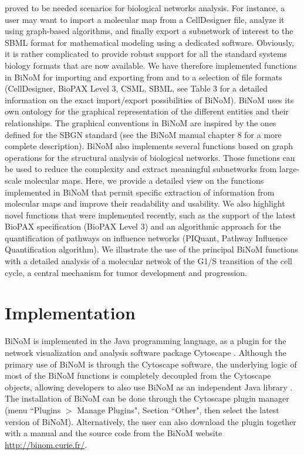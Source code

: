 \documentclass[10pt]{bmc_article}
\newenvironment{bmcformat}{\baselineskip20pt\sloppy\setboolean{publ}{false}}{\baselineskip20pt\sloppy}
\begin{document}
\begin{bmcformat}
proved to be needed scenarios for biological networks analysis. For instance, a user may want
to import a molecular map from a CellDesigner file, analyze it using graph-based
algorithms, and finally export a subnetwork of interest to the SBML format for
mathematical modeling using a dedicated software. Obviously, it is rather
complicated to provide robust support for all the standard systems biology
formats that are now available. We have therefore implemented functions in BiNoM
for importing and exporting from and to a selection of file formats
(CellDesigner, BioPAX Level 3, CSML, SBML, see Table 3 for a detailed
information on the exact import/export possibilities of BiNoM). BiNoM uses its
own ontology for the graphical representation of the different entities and
their relationships. The graphical conventions in BiNoM are inspired by the ones defined for the SBGN standard
(see the BiNoM manual chapter 8 for a more complete description).
BiNoM also implements several functions based on graph operations for the structural analysis of
biological networks. Those functions can be used to reduce the complexity and
extract meaningful subnetworks from large-scale molecular maps. Here, we provide
a detailed view on the functions implemented in BiNoM
that permit specific extraction of information from molecular maps
and improve their readability and usability. We also highlight novel functions
that were implemented recently, such as the support of the latest BioPAX
specification (BioPAX Level 3) and an algorithmic approach for the
quantification of pathways on influence networks (PIQuant, Pathway Influence Quantification algorithm). We illustrate the
use of the principal BiNoM functions with a detailed analysis of a molecular
netwok of the G1/S transition of the cell cycle, a central mechanism
for tumor development and progression.

\section*{Implementation}
BiNoM is implemented in the Java\texttrademark{} programming language, as a plugin
for the network visualization and analysis software package Cytoscape
\cite{cline2007integration}. Although the primary use of BiNoM is through the
Cytoscape software, the underlying logic of most of the BiNoM functions is completely
decoupled from the Cytoscape objects, allowing developers to also use BiNoM as
an independent Java library \cite{zinovyev2008binom}. The installation of BiNoM
can be done through the Cytoscape plugin manager (menu ``Plugins $>$ Manage
Plugins", Section ``Other", then select the latest version of BiNoM). Alternatively, the user can
also download the plugin together with a manual and the source code from the
BiNoM website \url{http://binom.curie.fr/}.


\end{bmcformat}
\end{document}
